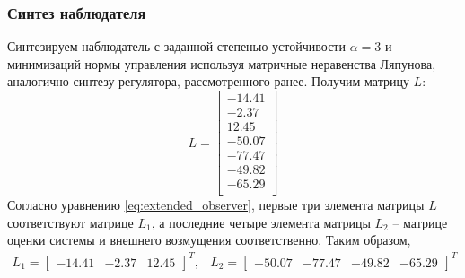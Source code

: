 \subsubsection{Синтез наблюдателя}
Синтезируем наблюдатель с заданной степенью устойчивости $\alpha = 3$ и минимизаций нормы управления
используя матричные неравенства Ляпунова, аналогично синтезу регулятора, рассмотренного ранее. 
Получим матрицу $L$:
\begin{equation}
    L = \begin{bmatrix}
        -14.41 \\ 
        -2.37 \\ 
        12.45 \\ 
        -50.07 \\ 
        -77.47 \\ 
        -49.82 \\ 
        -65.29 \\ 
    \end{bmatrix}
\end{equation}
Согласно уравнению \ref{eq:extended_observer}, первые три элемента матрицы $L$
соответствуют матрице $L_1$, а последние четыре элемента матрицы $L_2$ -- 
матрице оценки системы и внешнего возмущения соответственно.
Таким образом,
\begin{equation}
    \begin{array}{cc}
        L_1 = \begin{bmatrix}
            -14.41 & -2.37 & 12.45
        \end{bmatrix}^T, &
        L_2 = \begin{bmatrix}
            -50.07 & -77.47 & -49.82 & -65.29
        \end{bmatrix}^T
    \end{array}
\end{equation}

